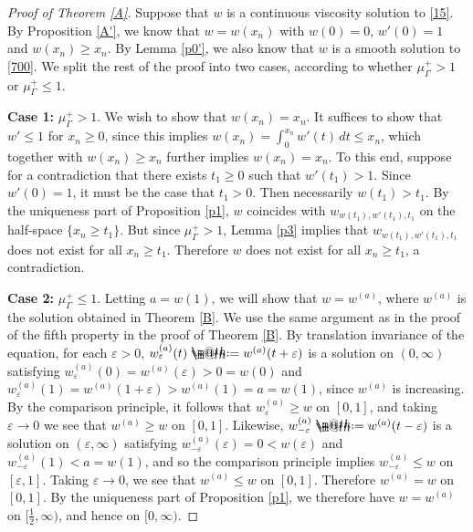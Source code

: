 \documentclass[12pt]{article}
\makeatletter
\numberwithin{equation}{section}
\theoremstyle{plain}
\theoremstyle{definition}
\newcommand{\ep}{\varepsilon}
\newcommand*{\defeq}{\mathrel{\rlap{%
			\raisebox{0.3ex}{$\m@th\cdot$}}%
		\raisebox{-0.3ex}{$\m@th\cdot$}}%
	=}
\makeatother
\begin{document}
\begin{proof}[Proof of Theorem \ref{A}]
		Suppose that $w$ is a continuous viscosity solution to \eqref{15}. By Proposition \ref{A'}, we know that $w = w(x_n)$ with $w(0)=0$, $w'(0)=1$ and $w(x_n) \geq x_n$. By Lemma \ref{p0'}, we also know that $w$ is a smooth solution to \eqref{700}. We split the rest of the proof into two cases, according to whether $\mu_\Gamma^+>1$ or $\mu_\Gamma^+ \leq 1$. \medskip 
	
	\noindent\textbf{Case 1:} $\mu_\Gamma^+>1$.  We wish to show that $w(x_n)=x_n$. It suffices to show that $w' \leq 1$ for $x_n \geq 0$, since this implies $w(x_n) = \int_0^{x_n}w'(t)\,dt \leq x_n$, which together with $w(x_n) \geq x_n$ further implies $w(x_n) = x_n$. To this end, suppose for a contradiction that there exists $t_1 \geq 0$ such that $w'(t_1) >1$. Since $w'(0)=1$, it must be the case that $t_1>0$. Then necessarily $w(t_1) > t_1$. By the uniqueness part of Proposition \ref{p1}, $w$ coincides with $w_{w(t_1), w'(t_1), t_1}$ on the half-space $\{x_n \geq t_1\}$. But since $\mu_\Gamma^+>1$, Lemma \ref{p3} implies that $w_{w(t_1), w'(t_1), t_1}$ does not exist for all $x_n \geq t_1$. Therefore $w$ does not exist for all $x_n \geq t_1$, a contradiction. \medskip 
	
	\noindent\textbf{Case 2:} $\mu_\Gamma^+ \leq 1$. Letting $a= w(1)$, we will show that $w=w^{(a)}$, where $w^{(a)}$ is the solution obtained in Theorem \ref{B}. We use the same argument as in the proof of the fifth property in the proof of Theorem \ref{B}. By translation invariance of the equation, for each $\ep>0$, $w^{(a)}_\ep(t) \defeq w^{(a)}(t+\ep)$ is a solution on $(0,\infty)$ satisfying $w^{(a)}_{\ep}(0) = w^{(a)}(\ep) > 0 = w(0)$ and $w^{(a)}_\ep(1) = w^{(a)}(1+\ep) > w^{(a)}(1) = a = w(1)$, since $w^{(a)}$ is increasing. By the comparison principle, it follows that $w_\ep^{(a)} \geq w$ on $[0,1]$, and taking $\ep\rightarrow 0$ we see that $w^{(a)} \geq w$ on $[0,1]$. Likewise, $w_{-\ep}^{(a)} \defeq w^{(a)}(t-\ep)$ is a solution on $(\ep,\infty)$ satisfying $w_{-\ep}^{(a)}(\ep) = 0 < w(\ep)$ and $w_{-\ep}^{(a)}(1) < a = w(1)$, and so the comparison principle implies $w_{-\ep}^{(a)} \leq w$ on $[\ep,1]$. Taking $\ep\rightarrow 0$, we see that $w^{(a)} \leq w$ on $[0,1]$. Therefore $w^{(a)} = w$ on $[0,1]$. By the uniqueness part of Proposition \ref{p1}, we therefore have $w = w^{(a)}$ on $[\frac{1}{2},\infty)$, and hence on $[0,\infty)$. 
\end{proof}
\end{document}
